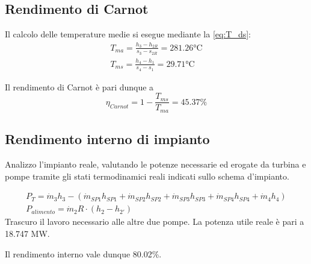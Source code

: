 \subsection{Rendimento di Carnot}
Il calcolo delle temperature medie si esegue mediante la \eqref{eq:T_ds}: 
\begin{align*}
    T_{ma} = \frac{h_3-h_{2R}}{s_3-s_{2R}} = 281.26 \text{°C} \\
    T_{ms} = \frac{h_4-h_1}{s_4-s_1} = 29.71 \text{°C}
\end{align*}

Il rendimento di Carnot è pari dunque a 
\begin{equation*}
    \eta_{Carnot} = 1 - \frac{T_{ms}}{T_{ma}} = 45.37\%
\end{equation*}

\subsection{Rendimento interno di impianto}
Analizzo l'impianto reale, valutando le potenze necessarie ed erogate da turbina e pompe tramite gli stati termodinamici reali indicati sullo schema d'impianto.

\begin{align*}
    P_T = \dot m_3 h_3 - (\dot m_{SP1}h_{SP1}+ \dot m_{SP2}h_{SP2}+ \dot m_{SP3}h_{SP3}+ \dot m_{SP4}h_{SP4}+ \dot m_4h_4) \\
    P_{alimento} = \dot m_2R \cdot (h_2 - h_{2'})
\end{align*}
Trascuro il lavoro necessario alle altre due pompe.
La potenza utile reale è pari a 18.747 MW.

Il rendimento interno vale dunque 80.02\%.
